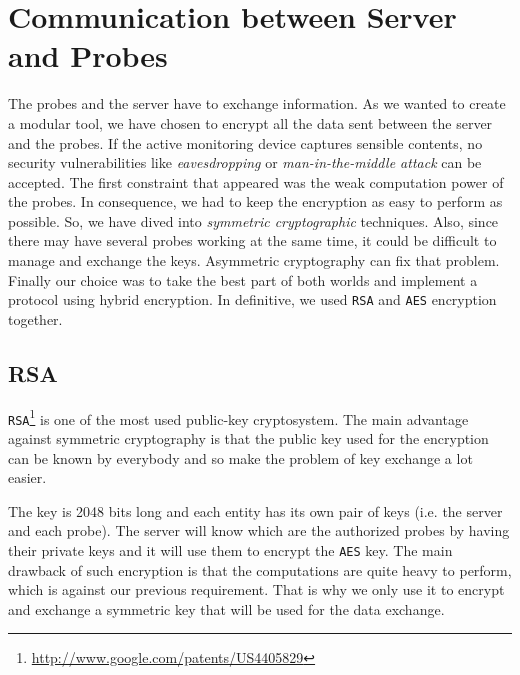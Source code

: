 \section{Communication between Server and Probes}
The probes and the server have to exchange information. As we wanted to create a modular tool, we have chosen to encrypt all the data sent between the server and the probes. If the active monitoring device captures sensible contents, no security vulnerabilities like \emph{eavesdropping} or \emph{man-in-the-middle attack} can be accepted.
The first constraint that appeared was the weak computation power of the probes. In consequence, we had to keep the encryption as easy to perform as possible. So, we have dived into \emph{symmetric cryptographic} techniques. Also, since there may have several probes working at the same time, it could be difficult to manage and exchange the keys. Asymmetric cryptography can fix that problem. Finally our choice was to take the best part of both worlds and implement a protocol using hybrid encryption.
In definitive, we used \texttt{RSA} and \texttt{AES} encryption together.

\subsection{RSA}
\texttt{RSA}\footnote{\url{http://www.google.com/patents/US4405829}} is one of the most used public-key cryptosystem. The main advantage against symmetric cryptography is that the public key used for the encryption can be known by everybody and so make the problem of key exchange a lot easier.

The key is 2048 bits long and each entity has its own pair of keys (i.e. the server and each probe). The server will know which are the authorized probes by having their private keys and it will use them to encrypt the \texttt{AES} key.
The main drawback of such encryption is that the computations are quite heavy to perform, which is against our previous requirement. That is why we only use it to encrypt and exchange a symmetric key that will be used for the data exchange.

